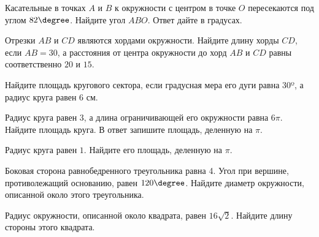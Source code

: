 \begin{class}[number=3]
\begin{listofex}
		\item Касательные в точках \( A \) и \( B \) к окружности с центром в точке \( O  \) пересекаются под углом \( 82\degree \). Найдите угол \( ABO \). Ответ дайте в градусах.
		\item Отрезки \( AB \) и \( CD \) являются хордами окружности. Найдите длину хорды \( CD \), если \( AB  =  30 \), а расстояния от центра окружности до хорд \( AB \) и \( CD \) равны соответственно \( 20 \) и \( 15 \).
		\item Найдите площадь кругового сектора, если градусная мера его дуги равна 30º, а радиус круга равен 6 см.
		\item Радиус круга равен \( 3 \), а длина ограничивающей его окружности равна \( 6\pi \). Найдите площадь круга. В ответ запишите площадь, деленную на \( \pi \).
		\item Радиус круга равен \( 1 \). Найдите его площадь, деленную на \( \pi \).
		\item Боковая сторона равнобедренного треугольника равна 4. Угол при вершине, противолежащий основанию, равен \( 120\degree \). Найдите диаметр окружности, описанной около этого треугольника.
		\item Радиус окружности, описанной около квадрата, равен \( 16\sqrt{2} \). Найдите длину стороны этого квадрата.
		
	\end{listofex}
\end{class}

